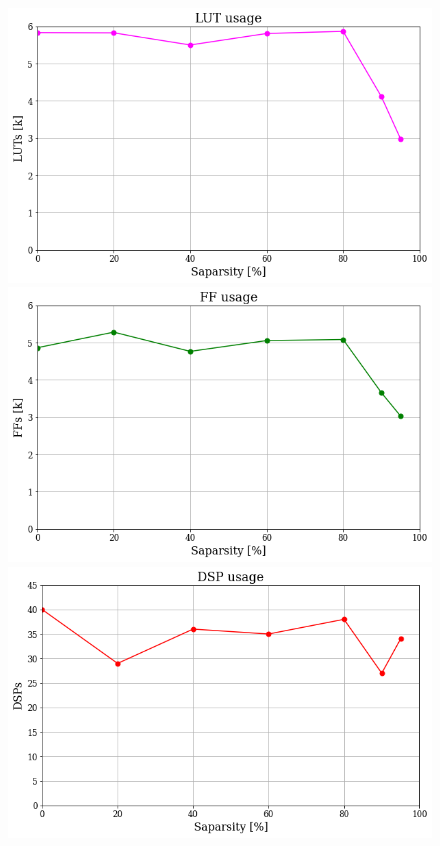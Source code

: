 \documentclass[../../main.tex]{subfiles}
\begin{document}
\begin{figure}[ht] 
  \label{ fig7} 
  \begin{minipage}[b]{0.5\linewidth}
    \centering
    \includegraphics[width=.95\linewidth]{sections/05/Images/Prune_LUT_1ele.png} 
    \vspace{2ex}
  \end{minipage}%
  \begin{minipage}[b]{0.5\linewidth}
    \centering
    \includegraphics[width=.95\linewidth]{sections/05/Images/Prune_FF_1ele.png}
    \vspace{2ex}
  \end{minipage} 
  \begin{minipage}[b]{0.5\linewidth}
    \centering
    \includegraphics[width=.95\linewidth]{sections/05/Images/Prune_DSP_1ele.png} 

\end{minipage}
\end{figure}
\end{document}
